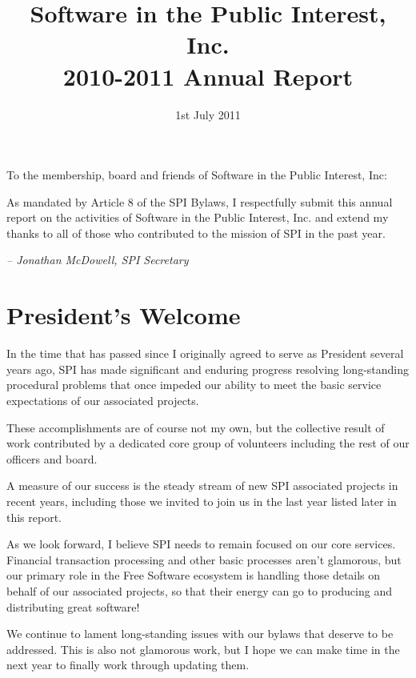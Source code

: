 \documentclass[letterpaper]{report}
\begin{document}
\title{Software in the Public Interest, Inc.\\
2010-2011 Annual Report}
\date{1st July 2011}

\maketitle

To the membership, board and friends of Software in the Public Interest, Inc:

As mandated by Article 8 of the SPI Bylaws, I respectfully submit this annual
report on the activities of Software in the Public Interest, Inc. and extend my
thanks to all of those who contributed to the mission of SPI in the past year.

  \emph{-- Jonathan McDowell, SPI Secretary}

\newpage

\tableofcontents

\newpage

\chapter{President's Welcome}
\label{sec:president}

In the time that has passed since I originally agreed to serve as President
several years ago, SPI has made significant and enduring progress resolving
long-standing procedural problems that once impeded our ability to meet the
basic service expectations of our associated projects.

These accomplishments are of course not my own, but the collective result of
work contributed by a dedicated core group of volunteers including the rest of
our officers and board.

A measure of our success is the steady stream of new SPI associated projects in
recent years, including those we invited to join us in the last year listed
later in this report.

As we look forward, I believe SPI needs to remain focused on our core services.
Financial transaction processing and other basic processes aren't glamorous,
but our primary role in the Free Software ecosystem is handling those details
on behalf of our associated projects, so that their energy can go to producing
and distributing great software!

We continue to lament long-standing issues with our bylaws that deserve to be
addressed.  This is also not glamorous work, but I hope we can make time in the
next year to finally work through updating them.
\end{document}

